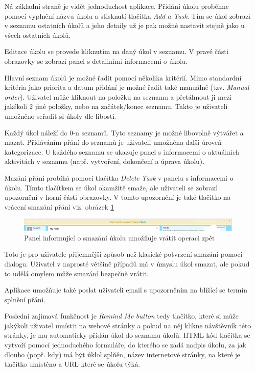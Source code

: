 Ná základní straně je vidět jednoduchost aplikace. Přidání úkolu proběhne pomocí vyplnění názvu úkolu a stisknutí tlačítka \emph{Add a Task}. Tím se úkol zobrazí v seznamu ostatních úkolů a jeho detaily už je pak možné nastavit stejně jako u všech ostatních úkolů.

Editace úkolu se provede kliknutím na daný úkol v seznamu. V pravé části obrazovky se zobrazí panel s detailními informacemi o úkolu.

Hlavní seznam úkolů je možné řadit pomocí několika kritérií. Mimo standardní kritéria jako priorita a datum přidání je možné řadit také manuálně (tzv. \emph{Manual order}). Uživatel může kliknout na položku na seznamu a přetáhnout ji mezi jakékoli 2 jiné položky, nebo na začátek/konec seznamu. Takto je uživateli umožněno seřadit si úkoly dle libosti.

Každý úkol náleží do 0-n seznamů. Tyto seznamy je možné libovolně výtvářet a mazat. Přidáváním přání do seznamů je uživateli umožněna další úroveň kategorizace. U každého seznamu se ukazuje panel s informacemi o aktuálních aktivitách v seznamu (např. vytvoření, dokončení a úprava úkolu).

Mazání přání probíhá pomocí tlačítka \emph{Delete Task} v panelu s informacemi o úkolu. Tímto tlačítkem se úkol okamžitě smaže, ale uživateli se zobrazí upozornění v horní části obrazovky. V tomto upozornění je také tlačítko na vrácení smazání přání viz. obrázek \ref{fig:astrid-undo}

\begin{figure}[htb]
\begin{center}
\includegraphics[width=130mm]{./pictures/astrid-undo.png}
\caption{Panel informující o smazání úkolu umožňuje vrátit operaci zpět}
\label{fig:astrid-undo}
\end{center}
\end{figure}

Toto je pro uživatele přijemnější způsob než klasické potvrzení smazání pomocí dialogu. Uživatel v naprosté většině případů má v úmyslu úkol smazat, ale pokud to udělá omylem může smazání bezpečně vrátit.

Aplikace umožňuje také poslat uživateli email s upozorněním na blížící se termín splnění přání.

Poslední zajímavá funkčnost je \emph{Remind Me button} tedy tlačítko, které si může jakýkoli uživatel umístit na webové stránky a pokud na něj klikne návštěvník této stránky, je mu automaticky přidán úkol do seznamu úkolů. HTML kód tlačítka se vytvoří pomocí jednoduchého formuláře, do kterého se zadá nadpis úkolu, za jak dlouho (popř. kdy) má být úklol splňěn, název internetové stránky, na které je tlačítko umístěno a URL které se úkolu týká.

